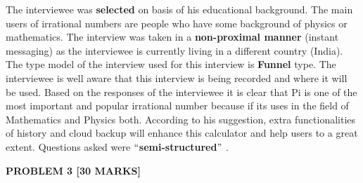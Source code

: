 \documentclass[12pt]{article}
\begin{document}
\begin{justify}
The interviewee was \textbf{selected} on basis of his educational background. The main users of irrational numbers are people who have some background of physics or mathematics. The interview was taken in a \textbf{non-proximal manner} (instant messaging) as the interviewee is currently living in a different country (India). The type model of the interview used for this interview is \textbf{Funnel} type. The interviewee is well aware that this interview is being recorded and where it will be used. Based on the responses of the interviewee it is clear that Pi is one of the most important and popular irrational number because if its uses in the field of Mathematics and Physics both. According to his suggestion, extra functionalities of history and cloud backup will enhance this calculator and help users to a great extent. Questions asked were \textbf{$``$semi-structured$"$ }.
\end{justify}\par


\vspace{\baselineskip}

\vspace{\baselineskip}

\vspace{\baselineskip}

\vspace{\baselineskip}

\vspace{\baselineskip}

\vspace{\baselineskip}

\vspace{\baselineskip}

\vspace{\baselineskip}

\vspace{\baselineskip}

\vspace{\baselineskip}

\vspace{\baselineskip}

\vspace{\baselineskip}
\textbf{PROBLEM 3 [30 MARKS]}\par



\end{document}
